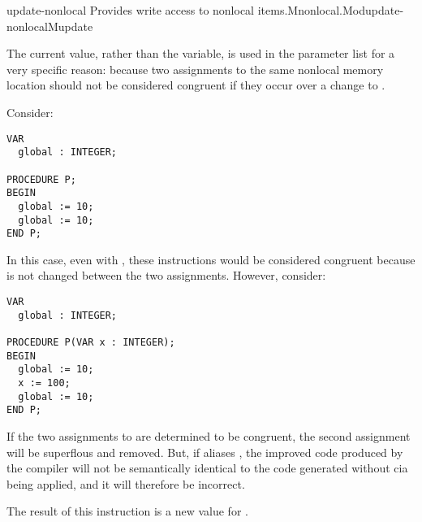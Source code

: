 \begin{instruction}{update-nonlocal}
   {Provides write access to
    nonlocal items.}{Mnonlocal.Mod}{update-nonlocal}{Mupdate}


\begin{notes}
  The current value, rather than the variable,  is used in
  the parameter list for a very specific reason: because two
  assignments to the same nonlocal memory location should not be
  considered congruent if they occur over a change to .

  Consider:
\begin{verbatim}
VAR
  global : INTEGER;

PROCEDURE P;
BEGIN
  global := 10;
  global := 10;
END P;
\end{verbatim}

  In this case, even with , these instructions would be
  considered congruent because  is not changed between the
  two assignments.  However, consider:

\begin{verbatim}
VAR
  global : INTEGER;

PROCEDURE P(VAR x : INTEGER);
BEGIN
  global := 10;
  x := 100;
  global := 10;
END P;
\end{verbatim}

  If the two assignments to  are determined to be
  congruent, the second assignment will be superflous and removed.
  But, if  aliases , the improved code produced
  by the compiler will not be semantically identical to the code
  generated without \acs{cia} being applied, and it will therefore be
  incorrect.
\end{notes}

  \begin{results}
  \item The result of this instruction is a new value for
    .
  \end{results}

  \begin{operands}
  \item {}
  \item {}
  \item {}
  \item {}
  \end{operands}

  \begin{seealso}
  \end{seealso}
\end{instruction}

